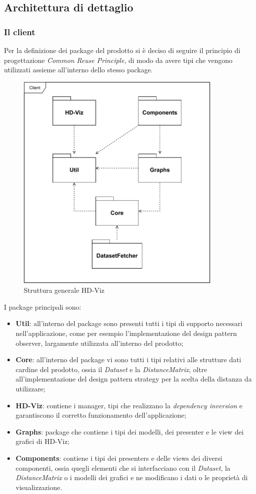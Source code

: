 \documentclass[../manuale_sviluppatore.tex]{subfiles}
\begin{document}
\subsection{Architettura di dettaglio}
\subsubsection{Il client}

Per la definizione dei package del prodotto si è deciso di seguire il principio di progettazione 
\emph{Common Reuse Principle}, di modo da avere tipi che vengono utilizzati assieme all'interno 
dello stesso package.

\begin{figure}[H]
	\centering
	\includegraphics[width=10cm]{img/packageDiagramOverview.pdf}
	\caption{Struttura generale HD-Viz}
\end{figure}

I package principali sono:
\begin{itemize}
	\item \textbf{Util}: all'interno del package sono presenti tutti i tipi di supporto necessari 
	nell'applicazione, come per esempio l'implementazione del design pattern observer, largamente 
	utilizzata all'interno del prodotto;
	\item \textbf{Core}: all'interno del package vi sono tutti i tipi relativi alle strutture dati 
	cardine del prodotto, ossia il \emph{Dataset} e la \emph{DistanceMatrix}, oltre 
	all'implementazione del design pattern strategy per la scelta della distanza da utilizzare;
	\item \textbf{HD-Viz}: contiene i manager, tipi che realizzano la \emph{dependency inversion} e 
	garantiscono il corretto funzionamento dell'applicazione;
	\item \textbf{Graphs}: package che contiene i tipi dei modelli, dei presenter e le view dei 
	grafici di HD-Viz;
	\item \textbf{Components}: contiene i tipi dei presenters e delle views dei diversi componenti, 
	ossia quegli elementi che si interfacciano con il \emph{Dataset}, la \emph{DistanceMatrix} o i 
	modelli dei grafici e ne modificano i dati o le proprietà di visualizzazione.
\end{itemize}
\end{document}
